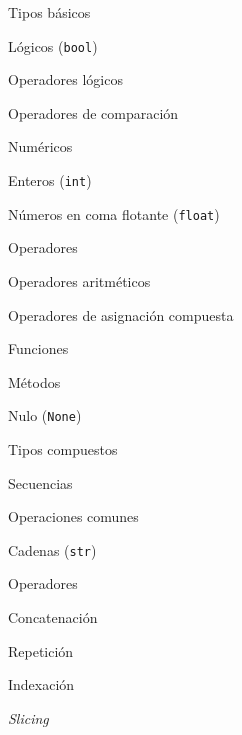 \begin{longenum}
    \begin{longenum}
        \item Tipos básicos
        \begin{longenum}
            \item Lógicos (\texttt{bool})
            \begin{longenum}
                \item Operadores lógicos
                \item Operadores de comparación
            \end{longenum}
            \item Numéricos
            \begin{longenum}
                \item Enteros (\texttt{int})
                \item Números en coma flotante (\texttt{float})
                \item Operadores
                \begin{longenum}
                    \item Operadores aritméticos
                    \item Operadores de asignación compuesta
                \end{longenum}
                \item Funciones
                \item Métodos
            \end{longenum}
            \item Nulo (\texttt{None})
        \end{longenum}
        \item Tipos compuestos
        \begin{longenum}
            \item Secuencias
            \begin{longenum}
                \item Operaciones comunes
                \item Cadenas (\texttt{str})
                \begin{longenum}
                    \item Operadores
                    \begin{longenum}
                        \item Concatenación
                        \item Repetición
                        \item Indexación
                        \item \textit{Slicing}

\end{longenum}
\end{longenum}
\end{longenum}
\end{longenum}
\end{longenum}
\end{longenum}
